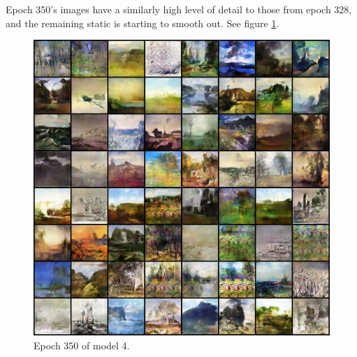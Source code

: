\documentclass[11pt,letterpaper]{article}
\begin{document}
				Epoch 350's images have a similarly high level of detail to those from epoch 328, and the remaining static is starting to smooth out.
				See figure \ref{fig:wa64:epoch350generator}.
				\begin{figure}
					\centering
					\includegraphics[width=1.0\linewidth]{results/model4/epoch350_generator}
					\caption{Epoch 350 of model 4.}
					\label{fig:wa64:epoch350generator}
				\end{figure}
\end{document}
